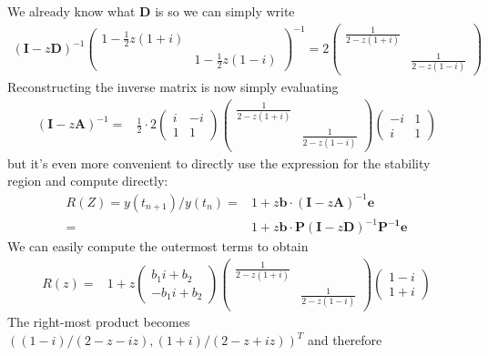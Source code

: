 \documentclass[10pt,a4paper]{article}
\newcommand{\half}[0]{\frac{1}{2}}
\newcommand{\bvec}[1]{\mathbf{#1}}
\begin{document}
We already know what $\bvec{D}$ is so we can simply write
\begin{align*}
  (\bvec{I} - z\bvec{D})^{-1}
  \begin{pmatrix}
    1 - \half z(1 + i) & \\
    & 1 - \half z(1 - i)
  \end{pmatrix}^{-1} =
  2\begin{pmatrix}
    \frac{1}{2 - z(1 + i)} & \\
    & \frac{1}{2 - z(1 - i)}
  \end{pmatrix}
\end{align*}
Reconstructing the inverse matrix is now simply evaluating
\begin{align*}
  (\bvec{I} - z\bvec{A})^{-1} =&
  \half\cdot2 \begin{pmatrix}
    i & -i \\
    1 &  1
  \end{pmatrix}
  \begin{pmatrix}
    \frac{1}{2 - z(1 + i)} & \\
    & \frac{1}{2 - z(1 - i)}
  \end{pmatrix}
  \begin{pmatrix}
   -i & 1 \\
    i & 1
  \end{pmatrix}
\end{align*}
but it's even more convenient to directly use the expression for the stability region and compute directly:
\begin{align*}
  R(Z) = y(t_{n+1})/y(t_n) =& 1 + z \bvec{b}\cdot(\bvec{I}-z\bvec{A})^{-1} \bvec{e} \\
  =& 1 + z \bvec{b}\cdot \bvec{P}(\bvec{I}-z\bvec{D})^{-1} \bvec{P^{-1}e}
\end{align*}
We can easily compute the outermost terms to obtain
\begin{align*}
  R(z) =& 1 + z\begin{pmatrix}
    b_1i + b_2 \\
   -b_1i + b_2
  \end{pmatrix} \begin{pmatrix}
    \frac{1}{2 - z(1+i)} & \\
    & \frac{1}{2 - z(1-i)}
  \end{pmatrix}
  \begin{pmatrix}
    1 - i \\
    1 + i
  \end{pmatrix}
\end{align*}
The right-most product becomes $\left((1-i)/(2-z - iz), (1+i)/(2 - z + iz)\right)^T$ and therefore
\end{document}
